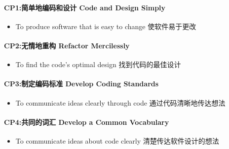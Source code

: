 \hypertarget{cp1ux7b80ux5355ux5730ux7f16ux7801ux548cux8bbeux8ba1-code-and-design-simply}{%
\paragraph{CP1:简单地编码和设计 Code and Design
Simply}\label{cp1ux7b80ux5355ux5730ux7f16ux7801ux548cux8bbeux8ba1-code-and-design-simply}}

\begin{itemize}
\tightlist
\item
  To produce software that is easy to change 使软件易于更改
\end{itemize}

\hypertarget{cp2ux65e0ux60c5ux5730ux91cdux6784-refactor-mercilessly}{%
\paragraph{CP2:无情地重构 Refactor
Mercilessly}\label{cp2ux65e0ux60c5ux5730ux91cdux6784-refactor-mercilessly}}

\begin{itemize}
\tightlist
\item
  To find the code's optimal design 找到代码的最佳设计
\end{itemize}

\hypertarget{cp3ux5236ux5b9aux7f16ux7801ux6807ux51c6-develop-coding-standards}{%
\paragraph{CP3:制定编码标准 Develop Coding
Standards}\label{cp3ux5236ux5b9aux7f16ux7801ux6807ux51c6-develop-coding-standards}}

\begin{itemize}
\tightlist
\item
  To communicate ideas clearly through code 通过代码清晰地传达想法
\end{itemize}

\hypertarget{cp4ux5171ux540cux7684ux8bcdux6c47-develop-a-common-vocabulary}{%
\paragraph{CP4:共同的词汇 Develop a Common
Vocabulary}\label{cp4ux5171ux540cux7684ux8bcdux6c47-develop-a-common-vocabulary}}

\begin{itemize}
\tightlist
\item
  To communicate ideas about code clearly 清楚传达软件设计的想法
\end{itemize}

